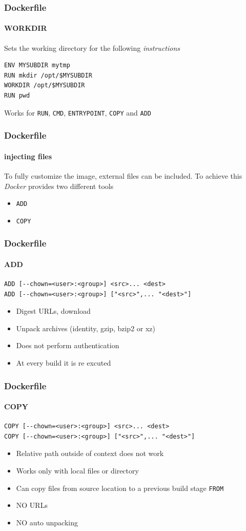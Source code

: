 \begin{frame}[fragile]
\frametitle{Dockerfile}
\framesubtitle{WORKDIR}

Sets the working directory for the following \textit{instructions}

\begin{lstlisting}
ENV MYSUBDIR mytmp
RUN mkdir /opt/$MYSUBDIR
WORKDIR /opt/$MYSUBDIR
RUN pwd
\end{lstlisting}

Works for \lstinline!RUN!, \lstinline!CMD!, \lstinline!ENTRYPOINT!, \lstinline!COPY! and \lstinline!ADD!
\end{frame}

\begin{frame}[fragile]
\frametitle{Dockerfile}
\framesubtitle{injecting files}

To fully customize the image, external files can be included. To achieve this \textit{Docker} provides two different tools

\begin{itemize}
\item \lstinline!ADD!
\item \lstinline!COPY!
\end{itemize}
\end{frame}

\begin{frame}[fragile]
\frametitle{Dockerfile}
\framesubtitle{ADD}

\begin{lstlisting}
ADD [--chown=<user>:<group>] <src>... <dest>
ADD [--chown=<user>:<group>] ["<src>",... "<dest>"]
\end{lstlisting}
\begin{itemize}
\item Digest URLs, download
\item Unpack archives (identity, gzip, bzip2 or xz)
\item Does not perform authentication
\item At every build it is re excuted
\end{itemize}
\end{frame}

\begin{frame}[fragile]
\frametitle{Dockerfile}
\framesubtitle{COPY}

\begin{lstlisting}
COPY [--chown=<user>:<group>] <src>... <dest>
COPY [--chown=<user>:<group>] ["<src>",... "<dest>"]
\end{lstlisting}

\begin{itemize}
\item Relative path outside of context does not work
\item Works only with local files or directory
\item Can copy files from source location to a previous build stage \lstinline!FROM!
\item NO URLs
\item NO auto unpacking
\end{itemize}
\end{frame}


